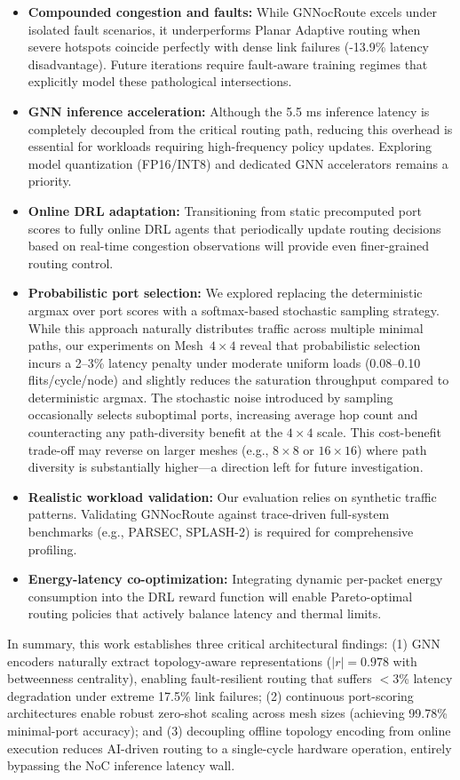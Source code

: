 \begin{itemize}
    \item \textbf{Compounded congestion and faults:} While GNNocRoute excels under isolated fault scenarios, it underperforms Planar Adaptive routing when severe hotspots coincide perfectly with dense link failures (-13.9\% latency disadvantage). Future iterations require fault-aware training regimes that explicitly model these pathological intersections.
    \item \textbf{GNN inference acceleration:} Although the 5.5 ms inference latency is completely decoupled from the critical routing path, reducing this overhead is essential for workloads requiring high-frequency policy updates. Exploring model quantization (FP16/INT8) and dedicated GNN accelerators remains a priority.
    \item \textbf{Online DRL adaptation:} Transitioning from static precomputed port scores to fully online DRL agents that periodically update routing decisions based on real-time congestion observations will provide even finer-grained routing control.
    \item \textbf{Probabilistic port selection:} We explored replacing the deterministic argmax over port scores with a softmax-based stochastic sampling strategy. While this approach naturally distributes traffic across multiple minimal paths, our experiments on Mesh~$4\times4$ reveal that probabilistic selection incurs a 2--3\% latency penalty under moderate uniform loads (0.08--0.10 flits/cycle/node) and slightly reduces the saturation throughput compared to deterministic argmax. The stochastic noise introduced by sampling occasionally selects suboptimal ports, increasing average hop count and counteracting any path-diversity benefit at the $4\times4$ scale. This cost-benefit trade-off may reverse on larger meshes (e.g., $8\times8$ or $16\times16$) where path diversity is substantially higher---a direction left for future investigation.
    \item \textbf{Realistic workload validation:} Our evaluation relies on synthetic traffic patterns. Validating GNNocRoute against trace-driven full-system benchmarks (e.g., PARSEC, SPLASH-2) is required for comprehensive profiling.
    \item \textbf{Energy-latency co-optimization:} Integrating dynamic per-packet energy consumption into the DRL reward function will enable Pareto-optimal routing policies that actively balance latency and thermal limits.
\end{itemize}

In summary, this work establishes three critical architectural findings: (1) GNN encoders naturally extract topology-aware representations ($|r|=0.978$ with betweenness centrality), enabling fault-resilient routing that suffers $<$3\% latency degradation under extreme 17.5\% link failures; (2) continuous port-scoring architectures enable robust zero-shot scaling across mesh sizes (achieving 99.78\% minimal-port accuracy); and (3) decoupling offline topology encoding from online execution reduces AI-driven routing to a single-cycle hardware operation, entirely bypassing the NoC inference latency wall.
